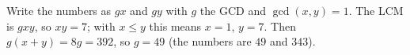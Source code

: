 Write the numbers as $gx$ and $gy$ with $g$ the GCD and $\gcd(x,y)=1$. The LCM is $gxy$, so $xy=7$; with $x\le y$ this means $x=1$, $y=7$. Then $g(x+y)=8g=392$, so $g=\boxed{49}$ (the numbers are $49$ and $343$).

